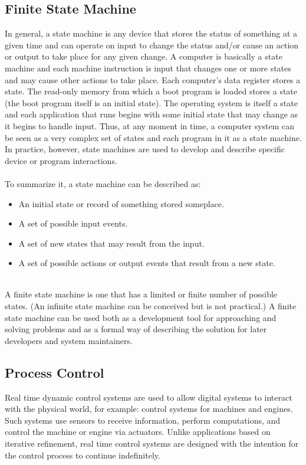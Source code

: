 \documentclass{article}
\begin{document}
\subsection{Finite State Machine}
In general, a state machine is any device that stores the status of something at a given time and can operate on input to change the status and/or cause an action or output to take place for any given change. A computer is basically a state machine and each machine instruction is input that changes one or more states and may cause other actions to take place. Each computer's data register stores a state. The read-only memory from which a boot program is loaded stores a state (the boot program itself is an initial state). The operating system is itself a state and each application that runs begins with some initial state that may change as it begins to handle input. Thus, at any moment in time, a computer system can be seen as a very complex set of states and each program in it as a state machine. In practice, however, state machines are used to develop and describe specific device or program interactions.\\\\


\noindent To summarize it, a state machine can be described as:
\begin{itemize}

\item An initial state or record of something stored someplace.
\item A set of possible input events.
\item A set of new states that may result from the input.
\item A set of possible actions or output events that result from a new state.\\\\

\end{itemize}

\noindent A finite state machine is one that has a limited or finite number of possible states. (An infinite state machine can be conceived but is not practical.) A finite state machine can be used both as a development tool for approaching and solving problems and as a formal way of describing the solution for later developers and system maintainers.

\newpage


\subsection{Process Control}
Real time dynamic control systems are used to allow digital systems to interact with the physical world, for example: control systems for machines and engines. Such systems use sensors to receive information, perform computations, and control the machine or engine via actuators. Unlike applications based on iterative refinement, real time control systems are designed with the intention for the control process to continue indefinitely.\\
\end{document}
